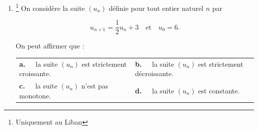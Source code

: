 \begin{enumerate}[resume]
\item \footnote{Uniquement au Liban} On considère la suite $\left(u_n\right)$ définie pour tout entier naturel $n$ par

\[u_{n+1} = \dfrac12u_n + 3\quad \text{et}\quad u_0 = 6.\]

On peut affirmer que :

\begin{center}
\begin{tabularx}{\linewidth}{*{2}{X}}
\textbf{a.~~} la suite $\left(u_n\right)$ est strictement croissante.&\textbf{b.~~} la suite $\left(u_n\right)$ est strictement décroissante.\\
\textbf{c.~~} la suite $\left(u_n\right)$ n'est pas monotone. &\textbf{d.~~} la suite $\left(u_n\right)$ est constante.
\end{tabularx}
\end{center}
\end{enumerate}

\bigskip
